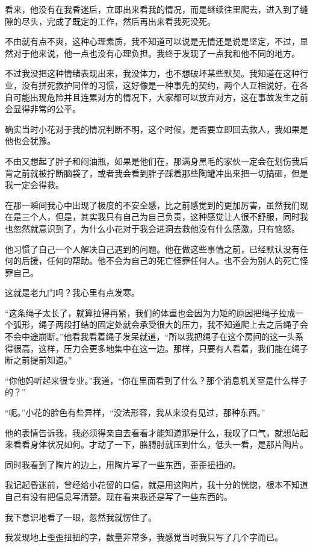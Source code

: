 看来，他没有在我昏迷后，立即出来看我的情况，而是继续往里爬去，进入到了缝隙的尽头，完成了既定的工作，然后再出来看我死没死。

不由就有点不爽，这种心理素质，我不知道可以说是无情还是说是坚定，不过，显然对于他来说，他一点也没有心理负担。我终于发现了一点我和他不同的地方。

不过我没把这种情绪表现出来，我没体力，也不想破坏某些默契。我知道在这种行业，没有拼死救护同伴的习惯，这好像是一种事先的契约，两个人互相说好，在各自可能出现危险并且连累对方的情况下，大家都可以放弃对方，这在事故发生之前会显得非常的公平。

确实当时小花对于我的情况判断不明，这个时候，是否要立即回去救人，我如果是他也会犹豫。

不由又想起了胖子和闷油瓶，如果是他们在，那满身黑毛的家伙一定会在划伤我后背之前就被拧断脑袋了，或者我会看到胖子踩着那些陶罐冲出来把一切搞砸，但是我一定会得救。

在那一瞬间我心中出现了极度的不安全感，比之前感觉到的更加厉害，虽然我们现在是三个人，但是，其实我只有自己为自己负责，这种感觉让人很不舒服，同时我也忽然就意识到了，为什么小花对于我会进洞去救他没有什么感激，只有恼怒。

他习惯了自己一个人解决自己遇到的问题。他在做这些事情之前，已经默认没有任何的后援，任何的帮助。他不会为自己的死亡怪罪任何人。也不会为别人的死亡怪罪自己。

这就是老九门吗？我心里有点发寒。

“这条绳子太长了，就算拉得再紧，我们的体重也会因为力矩的原因把绳子拉成一个弧形，绳子两段打结的固定处就会承受很大的压力，我不知道爬上去之后绳子会不会中途崩断。”他看我看着绳子发呆就道，“所以我把绳子在这个房间的这一头系得很高，这样，压力会更多地集中在这一边。那样，只要有人看着，我们能在绳子断之前提前知道。”

“你他妈听起来很专业。”我道，“你在里面看到了什么？那个消息机关室是什么样子的？”

“呃。”小花的脸色有些异样，“没法形容，我从来没有见过，那种东西。”

他的表情告诉我，我必须得亲自去看看才能知道那是什么，我叹了口气，就想站起来看看身体状况如何。才动了一下，胳膊肘就压到什么，低头一看，是那片陶片。

同时我看到了陶片的边上，用陶片写了一些东西，歪歪扭扭的。

我记起昏迷前，曾经给小花留的口信，就是用这陶片，我十分的恍惚，根本不知道自己有没有把信息写清楚。现在看来我还是写了一些东西的。

我下意识地看了一眼，忽然我就愣住了。

我发现地上歪歪扭扭的字，数量非常多，我感觉当时我只写了几个字而已。

